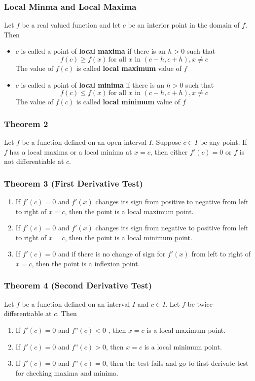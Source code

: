 \documentclass[12pt]{article}
\begin{document}
\subsubsection*{Local Minma and Local Maxima }
Let $f$ be a real valued function and let $c$ be an interior point in the domain
of $f$. Then
\begin{itemize}
    \item $c$ is called a point of \textbf{local maxima} if there is an $h > 0$ such that $$ f(c) \geq f(x) \, \text{for all $x$ in } (c-h,c+h),x \not = c$$ The value of $f(c)$ is called \textbf{local maximum} value of $f$
    \item $c$ is called a point of \textbf{local minima} if there is an $h > 0$ such that $$ f(c) \leq f(x) \, \text{for all $x$ in } (c-h,c+h),x \not = c$$ The value of $f(c)$ is called \textbf{local minimum} value of $f$

\end{itemize}
\subsubsection*{Theorem 2}
Let $f$ be a function defined on an open interval $I$. Suppose $c \in I$ be any
point. If $f$ has a local maxima or a local minima at $x = c$, then either $f'(c) = 0$ or $f$ is not
differentiable at $c$.

\subsubsection*{Theorem 3 (First Derivative Test)}
\begin{enumerate}
    \item If $f'(c) = 0$ and $f'(x)$ changes its sign from positive to negative from left to right of $x = c$, then the point is a local maximum point.
    \item If $f'(c) = 0 $ and $f'(x)$ changes its sign from negative to positive from left to right of $x = c$, then the point is a local minimum point.
    \item If $f'(c) = 0$ and if there is no change of sign for $f'(x)$ from left to right of $x = c$, then the point is a inflexion point.
\end{enumerate}
\subsubsection*{Theorem 4 (Second Derivative Test)}
Let $f$ be a function defined on an interval $I$
and $c \in I$. Let $f$ be twice differentiable at $c$. Then
\begin{enumerate}
    \item If $f'(c) = 0$ and $f”(c) < 0$ , then $x = c$ is a local maximum point.
    \item If $f'(c) = 0$ and $f”(c) > 0$, then $x = c$ is a local minimum point.
    \item If $f'(c) = 0$ and $f”(c) = 0$, then the test fails and go to first derivate test for checking maxima and minima.
\end{enumerate}
\end{document}
